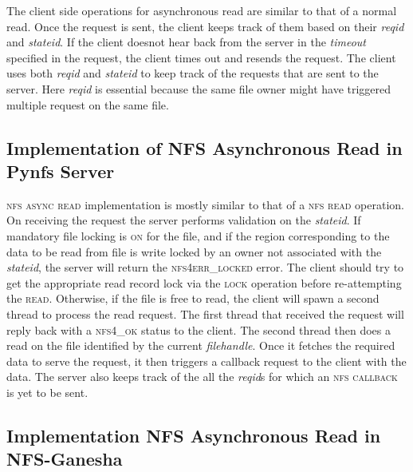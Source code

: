The client side operations for asynchronous read are similar to that of a normal read. Once the request is sent, the client keeps track of them based on their \textit{reqid} and \textit{stateid}. If the client doesnot hear back from the server in the \textit{timeout} specified in the request, the client times out and resends the request. The client uses both \textit{reqid} and \textit{stateid} to keep track of the requests that are sent to the server.  Here \textit{reqid} is essential because the same file owner might have triggered multiple request on the same file.  
  
\subsection{Implementation of NFS Asynchronous Read in Pynfs Server}
 \textsc{nfs async read} implementation is mostly similar to that of a \textsc{nfs read} operation. On receiving the request the server performs validation on the \textit{stateid}. If mandatory file locking is \textsc{on} for the file, and if the region corresponding to the data to be read from file is write locked by an owner not associated with the \textit{stateid}, the server will return the \textsc{nfs4err\_locked} error. The client should try to get the appropriate read record lock via the \textsc{lock} operation before re-attempting the \textsc{read}. Otherwise, if the file is free to read, the client will spawn a second thread to process the read request. The first thread that received the request will reply back with a \textsc{nfs4\_ok} status to the client. The second thread then does a read on the file identified by the current \textit{filehandle}. Once it fetches the required data to serve the request, it then triggers a callback request to the client with the data. The server also keeps track of the all the \textit{reqid}s for which an \textsc{nfs callback} is yet to be sent.
 
    
\subsection{Implementation NFS Asynchronous Read in NFS-Ganesha}  

